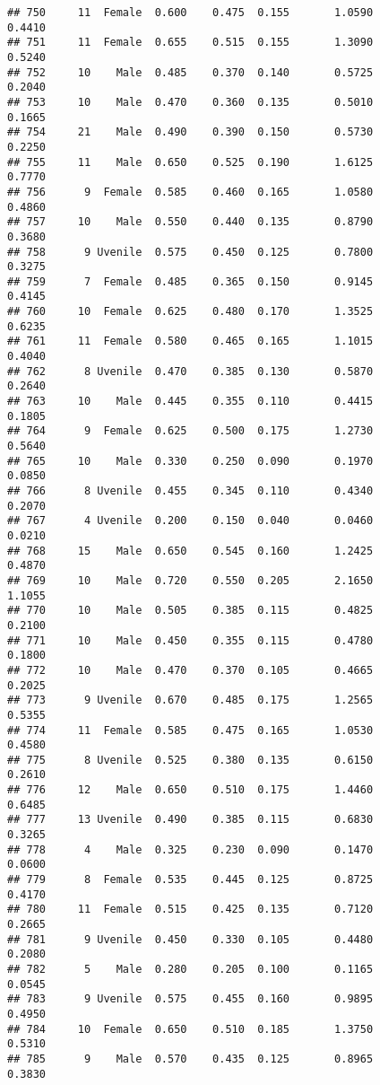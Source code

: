 \documentclass[
]{article}
\begin{document}
\begin{verbatim}
## 750     11  Female  0.600    0.475  0.155       1.0590         0.4410
## 751     11  Female  0.655    0.515  0.155       1.3090         0.5240
## 752     10    Male  0.485    0.370  0.140       0.5725         0.2040
## 753     10    Male  0.470    0.360  0.135       0.5010         0.1665
## 754     21    Male  0.490    0.390  0.150       0.5730         0.2250
## 755     11    Male  0.650    0.525  0.190       1.6125         0.7770
## 756      9  Female  0.585    0.460  0.165       1.0580         0.4860
## 757     10    Male  0.550    0.440  0.135       0.8790         0.3680
## 758      9 Uvenile  0.575    0.450  0.125       0.7800         0.3275
## 759      7  Female  0.485    0.365  0.150       0.9145         0.4145
## 760     10  Female  0.625    0.480  0.170       1.3525         0.6235
## 761     11  Female  0.580    0.465  0.165       1.1015         0.4040
## 762      8 Uvenile  0.470    0.385  0.130       0.5870         0.2640
## 763     10    Male  0.445    0.355  0.110       0.4415         0.1805
## 764      9  Female  0.625    0.500  0.175       1.2730         0.5640
## 765     10    Male  0.330    0.250  0.090       0.1970         0.0850
## 766      8 Uvenile  0.455    0.345  0.110       0.4340         0.2070
## 767      4 Uvenile  0.200    0.150  0.040       0.0460         0.0210
## 768     15    Male  0.650    0.545  0.160       1.2425         0.4870
## 769     10    Male  0.720    0.550  0.205       2.1650         1.1055
## 770     10    Male  0.505    0.385  0.115       0.4825         0.2100
## 771     10    Male  0.450    0.355  0.115       0.4780         0.1800
## 772     10    Male  0.470    0.370  0.105       0.4665         0.2025
## 773      9 Uvenile  0.670    0.485  0.175       1.2565         0.5355
## 774     11  Female  0.585    0.475  0.165       1.0530         0.4580
## 775      8 Uvenile  0.525    0.380  0.135       0.6150         0.2610
## 776     12    Male  0.650    0.510  0.175       1.4460         0.6485
## 777     13 Uvenile  0.490    0.385  0.115       0.6830         0.3265
## 778      4    Male  0.325    0.230  0.090       0.1470         0.0600
## 779      8  Female  0.535    0.445  0.125       0.8725         0.4170
## 780     11  Female  0.515    0.425  0.135       0.7120         0.2665
## 781      9 Uvenile  0.450    0.330  0.105       0.4480         0.2080
## 782      5    Male  0.280    0.205  0.100       0.1165         0.0545
## 783      9 Uvenile  0.575    0.455  0.160       0.9895         0.4950
## 784     10  Female  0.650    0.510  0.185       1.3750         0.5310
## 785      9    Male  0.570    0.435  0.125       0.8965         0.3830

\end{verbatim}
\end{document}
